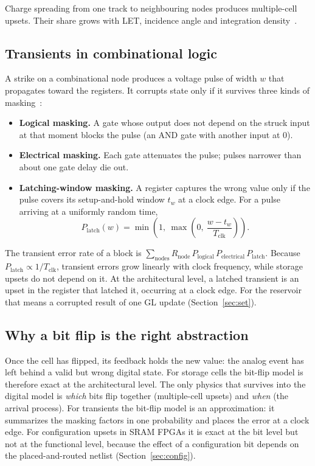 \documentclass[11pt,a4paper]{article}
\begin{document}
Charge spreading from one track to neighbouring nodes produces multiple-cell upsets. Their share grows with LET, incidence angle and integration density~\cite{reed1997,quinn2005}.

\subsection{Transients in combinational logic}

A strike on a combinational node produces a voltage pulse of width $w$ that propagates toward the registers. It corrupts state only if it survives three kinds of masking~\cite{shivakumar2002}:
\begin{itemize}
  \item \textbf{Logical masking.} A gate whose output does not depend on the struck input at that moment blocks the pulse (an AND gate with another input at 0).
  \item \textbf{Electrical masking.} Each gate attenuates the pulse; pulses narrower than about one gate delay die out.
  \item \textbf{Latching-window masking.} A register captures the wrong value only if the pulse covers its setup-and-hold window $t_w$ at a clock edge. For a pulse arriving at a uniformly random time,
  \begin{equation}
  P_{\mathrm{latch}}(w) = \min\!\left(1,\ \max\!\left(0,\ \frac{w - t_w}{T_{\mathrm{clk}}}\right)\right).
  \label{eq:platch}
  \end{equation}
\end{itemize}
The transient error rate of a block is $\sum_{\mathrm{nodes}} R_{\mathrm{node}}\, P_{\mathrm{logical}}\, P_{\mathrm{electrical}}\, P_{\mathrm{latch}}$. Because $P_{\mathrm{latch}} \propto 1/T_{\mathrm{clk}}$, transient errors grow linearly with clock frequency, while storage upsets do not depend on it. At the architectural level, a latched transient is an upset in the register that latched it, occurring at a clock edge. For the reservoir that means a corrupted result of one GL update (Section~\ref{sec:set}).

\subsection{Why a bit flip is the right abstraction}

Once the cell has flipped, its feedback holds the new value: the analog event has left behind a valid but wrong digital state. For storage cells the bit-flip model is therefore exact at the architectural level. The only physics that survives into the digital model is \emph{which} bits flip together (multiple-cell upsets) and \emph{when} (the arrival process). For transients the bit-flip model is an approximation: it summarizes the masking factors in one probability and places the error at a clock edge. For configuration upsets in SRAM FPGAs it is exact at the bit level but not at the functional level, because the effect of a configuration bit depends on the placed-and-routed netlist (Section~\ref{sec:config}).
\end{document}
